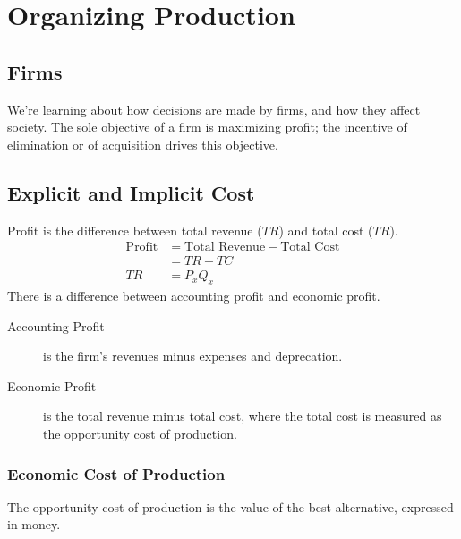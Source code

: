         \chapter{Organizing Production} %
        \label{cha:organizing_production}
            \section{Firms} %
            \label{sec:firms}
                We're learning about how decisions are made by firms, and how they affect society.
                The sole objective of a firm is maximizing profit; the incentive of elimination or of acquisition drives this objective.
            \section{Explicit and Implicit Cost} %
            \label{sec:explicit_and_implicit_cost}
                Profit is the difference between total revenue ($TR$) and total cost ($TR$).
                \begin{align*}
                    \text{Profit} &= \text{Total Revenue} - \text{Total Cost} \\
                    &= TR - TC \\
                    TR &= P_x Q_x
                \end{align*}
                There is a difference between accounting profit and economic profit.

                \begin{description}
                     \item[Accounting Profit] is the firm's revenues minus expenses and deprecation.
                     \item[Economic Profit] is the total revenue minus total cost, where the total cost is measured as the opportunity cost of production.
                 \end{description}
                 \subsection{Economic Cost of Production} %
                 \label{sub:economic_cost_of_production}
                    The opportunity cost of production is the value of the best alternative, expressed in money.

